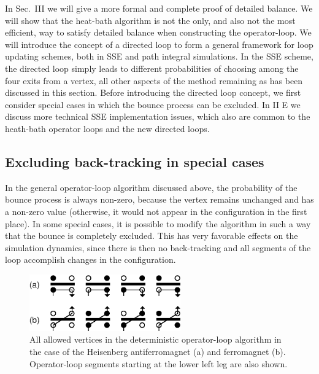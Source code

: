 \documentclass[10pt,pre,aps,twocolumn,showpacs,superscriptaddress,
floatfix]{revtex4}
\begin{document}
In Sec.~III we will give a more formal and complete proof of detailed balance. 
We will show that the heat-bath algorithm is not the only, and also not the 
most efficient, way to satisfy detailed balance when constructing the 
operator-loop. We will introduce the concept of a directed loop to form 
a general framework for loop updating schemes, both in SSE and path integral 
simulations. In the SSE scheme, the directed loop simply leads to different
probabilities of choosing among the four exits from a vertex, all other
aspects of the method remaining as has been discussed in this section.
Before introducing the directed loop concept, we first consider 
special cases in which the bounce process can be excluded. In II E we
discuss more technical SSE implementation issues, which also are common
to the heath-bath operator loops and the new directed loops.
 
\subsection{Excluding back-tracking in special cases}

In the general operator-loop algorithm discussed above, the probability of 
the bounce process is always non-zero, because  the vertex remains unchanged 
and has a non-zero value (otherwise, it would not appear in the configuration
in the first place). In some special cases, it is possible to modify the 
algorithm in such a way that the bounce is completely excluded. This has
very favorable effects on the simulation dynamics, since there is then no 
back-tracking and all segments of the loop accomplish changes in the 
configuration. 

\begin{figure}
\includegraphics[clip,width=6.5cm]{fig6.eps}
\caption{All allowed vertices in the deterministic operator-loop algorithm
in the case of the Heisenberg antiferromagnet (a) and ferromagnet (b). 
Operator-loop segments starting at the lower left leg are also shown.}
\label{dpaths}
\end{figure}
\end{document}
